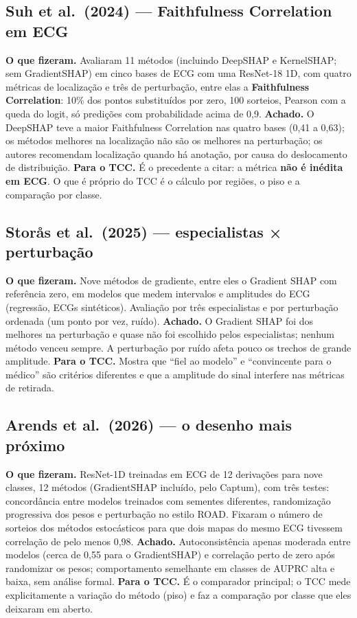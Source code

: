 \documentclass[11pt,a4paper]{article}
\begin{document}
\subsection{Suh et al.\ (2024) — Faithfulness Correlation em ECG}
\textbf{O que fizeram.} Avaliaram 11 métodos (incluindo DeepSHAP e KernelSHAP; sem GradientSHAP) em cinco bases de ECG com uma ResNet-18 1D, com quatro métricas de localização e três de perturbação, entre elas a \textbf{Faithfulness Correlation}: 10\% dos pontos substituídos por zero, 100 sorteios, Pearson com a queda do logit, só predições com probabilidade acima de 0,9. \textbf{Achado.} O DeepSHAP teve a maior Faithfulness Correlation nas quatro bases (0,41 a 0,63); os métodos melhores na localização não são os melhores na perturbação; os autores recomendam localização quando há anotação, por causa do deslocamento de distribuição. \textbf{Para o TCC.} É o precedente a citar: a métrica \textbf{não é inédita em ECG}. O que é próprio do TCC é o cálculo por regiões, o piso e a comparação por classe.

\subsection{Storås et al.\ (2025) — especialistas × perturbação}
\textbf{O que fizeram.} Nove métodos de gradiente, entre eles o Gradient SHAP com referência zero, em modelos que medem intervalos e amplitudes do ECG (regressão, ECGs sintéticos). Avaliação por três especialistas e por perturbação ordenada (um ponto por vez, ruído). \textbf{Achado.} O Gradient SHAP foi dos melhores na perturbação e quase não foi escolhido pelos especialistas; nenhum método venceu sempre. A perturbação por ruído afeta pouco os trechos de grande amplitude. \textbf{Para o TCC.} Mostra que ``fiel ao modelo'' e ``convincente para o médico'' são critérios diferentes e que a amplitude do sinal interfere nas métricas de retirada.

\subsection{Arends et al.\ (2026) — o desenho mais próximo}
\textbf{O que fizeram.} ResNet-1D treinadas em ECG de 12 derivações para nove classes, 12 métodos (GradientSHAP incluído, pelo Captum), com três testes: concordância entre modelos treinados com sementes diferentes, randomização progressiva dos pesos e perturbação no estilo ROAD. Fixaram o número de sorteios dos métodos estocásticos para que dois mapas do mesmo ECG tivessem correlação de pelo menos 0,98. \textbf{Achado.} Autoconsistência apenas moderada entre modelos (cerca de 0,55 para o GradientSHAP) e correlação perto de zero após randomizar os pesos; comportamento semelhante em classes de AUPRC alta e baixa, sem análise formal. \textbf{Para o TCC.} É o comparador principal; o TCC mede explicitamente a variação do método (piso) e faz a comparação por classe que eles deixaram em aberto.
\end{document}
